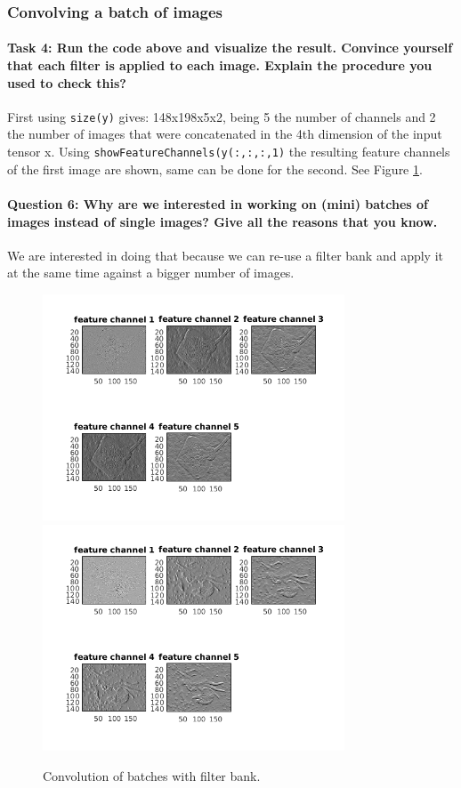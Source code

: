 \documentclass[12pt]{article}
\begin{document}
\subsubsection{Convolving a batch of images}
\paragraph{Task 4: Run the code above and visualize the result. Convince yourself that each filter is applied to each image. Explain the procedure you used to check this?} First using \texttt{size(y)} gives: 148x198x5x2, being 5 the number of channels and 2 the number of images that were concatenated in the 4th dimension of the input tensor x. Using \texttt{showFeatureChannels(y(:,:,:,1)} the resulting feature channels of the first image are shown, same can be done for the second. See Figure \ref{fig:113}.

\paragraph{Question 6: Why are we interested in working on (mini) batches of images instead of single images? Give all the reasons that you know.} We are interested in doing that because we can re-use a filter bank and apply it at the same time against a bigger number of images. 
\begin{figure}[htbp]
 \centering
 \includegraphics[width=0.8\textwidth]{113a}
 \includegraphics[width=0.8\textwidth]{113b}
 \caption{Convolution of batches with filter bank.}
 \label{fig:113}
\end{figure}
\end{document}
